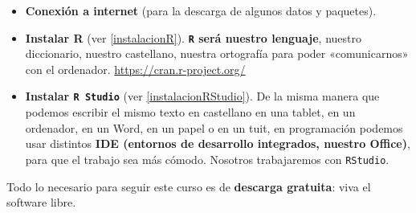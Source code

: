 \documentclass[11pt,]{book}
\begin{document}
\begin{itemize}
\item
  \textbf{Conexión a internet} (para la descarga de algunos datos y paquetes).
\item
  \textbf{Instalar R} (ver \ref{instalacionR}). \textbf{\texttt{R} será nuestro lenguaje}, nuestro diccionario, nuestro castellano, nuestra ortografía para poder «comunicarnos» con el ordenador. \url{https://cran.r-project.org/}
\item
  \textbf{Instalar \texttt{R\ Studio}} (ver \ref{instalacionRStudio}). De la misma manera que podemos escribir el mismo texto en castellano en una tablet, en un ordenador, en un Word, en un papel o en un tuit, en programación podemos usar distintos \textbf{IDE (entornos de desarrollo integrados, nuestro Office)}, para que el trabajo sea más cómodo. Nosotros trabajaremos con \texttt{RStudio}.
\end{itemize}

Todo lo necesario para seguir este curso es de \textbf{descarga gratuita}: viva el software libre.


\end{document}
